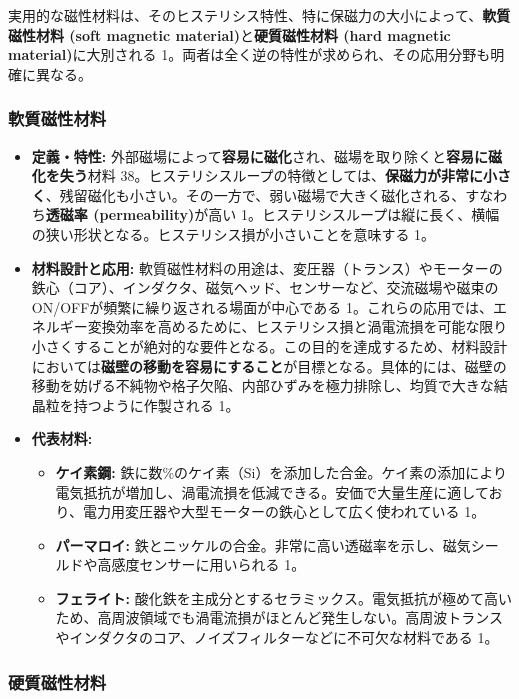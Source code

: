 \documentclass[11pt,a4paper]{ltjsarticle}
\begin{document}
実用的な磁性材料は、そのヒステリシス特性、特に保磁力の大小によって、\textbf{軟質磁性材料 (soft magnetic material)}と\textbf{硬質磁性材料 (hard magnetic material)}に大別される 1。両者は全く逆の特性が求められ、その応用分野も明確に異なる。

\subsubsection*{軟質磁性材料}

\begin{itemize}
\item \textbf{定義・特性:} 外部磁場によって\textbf{容易に磁化}され、磁場を取り除くと\textbf{容易に磁化を失う}材料 38。ヒステリシスループの特徴としては、\textbf{保磁力が非常に小さく}、残留磁化も小さい。その一方で、弱い磁場で大きく磁化される、すなわち\textbf{透磁率 (permeability)}が高い 1。ヒステリシスループは縦に長く、横幅の狭い形状となる。ヒステリシス損が小さいことを意味する 1。

\item \textbf{材料設計と応用:} 軟質磁性材料の用途は、変圧器（トランス）やモーターの鉄心（コア）、インダクタ、磁気ヘッド、センサーなど、交流磁場や磁束のON/OFFが頻繁に繰り返される場面が中心である 1。これらの応用では、エネルギー変換効率を高めるために、ヒステリシス損と渦電流損を可能な限り小さくすることが絶対的な要件となる。この目的を達成するため、材料設計においては\textbf{磁壁の移動を容易にすること}が目標となる。具体的には、磁壁の移動を妨げる不純物や格子欠陥、内部ひずみを極力排除し、均質で大きな結晶粒を持つように作製される 1。

\item \textbf{代表材料:}
\begin{itemize}
\item \textbf{ケイ素鋼:} 鉄に数\%のケイ素（Si）を添加した合金。ケイ素の添加により電気抵抗が増加し、渦電流損を低減できる。安価で大量生産に適しており、電力用変圧器や大型モーターの鉄心として広く使われている 1。
\item \textbf{パーマロイ:} 鉄とニッケルの合金。非常に高い透磁率を示し、磁気シールドや高感度センサーに用いられる 1。
\item \textbf{フェライト:} 酸化鉄を主成分とするセラミックス。電気抵抗が極めて高いため、高周波領域でも渦電流損がほとんど発生しない。高周波トランスやインダクタのコア、ノイズフィルターなどに不可欠な材料である 1。
\end{itemize}
\end{itemize}

\subsubsection*{硬質磁性材料}
\end{document}
